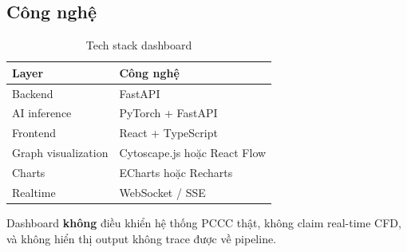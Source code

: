 \subsection{Công nghệ}

\begin{table}[H]
\centering
\caption{Tech stack dashboard}
\label{tab:techstack}
\begin{tabular}{l l}
\toprule
\textbf{Layer} & \textbf{Công nghệ} \\
\midrule
Backend          & FastAPI \\
AI inference     & PyTorch + FastAPI \\
Frontend         & React + TypeScript \\
Graph visualization & Cytoscape.js hoặc React Flow \\
Charts           & ECharts hoặc Recharts \\
Realtime         & WebSocket / SSE \\
\bottomrule
\end{tabular}
\end{table}

Dashboard \textbf{không} điều khiển hệ thống PCCC thật, không claim real-time CFD, và không hiển thị output không trace được về pipeline.
